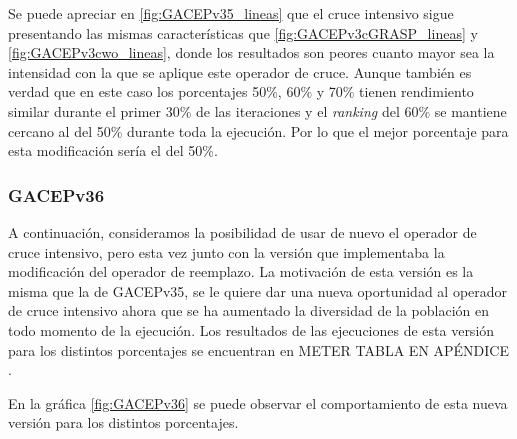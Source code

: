 Se puede apreciar en \ref{fig:GACEPv35_lineas} que el cruce intensivo sigue presentando las mismas características que \ref{fig:GACEPv3cGRASP_lineas} y \ref{fig:GACEPv3cwo_lineas}, donde los resultados son peores cuanto mayor sea la intensidad con la que se aplique este operador de cruce. 
Aunque también es verdad que en este caso los porcentajes 50\%, 60\% y 70\% tienen rendimiento similar durante el primer 30\% de las iteraciones y el \textit{ranking} del 60\% se mantiene cercano al del 50\% durante toda la ejecución. 
Por lo que el mejor porcentaje para esta modificación sería el del 50\%.

\subsubsection{GACEPv36}

A continuación, consideramos la posibilidad de usar de nuevo el operador de cruce intensivo, pero esta vez junto con la versión que implementaba la modificación del operador de reemplazo. 
La motivación de esta versión es la misma que la de GACEPv35, se le quiere dar una nueva oportunidad al operador de cruce intensivo ahora que se ha aumentado la diversidad de la población en todo momento de la ejecución. 
Los resultados de las ejecuciones de esta versión para los distintos porcentajes se encuentran en \color{red} METER TABLA EN APÉNDICE \color{black}.

En la gráfica \ref{fig:GACEPv36} se puede observar el comportamiento de esta nueva versión para los distintos porcentajes. 

